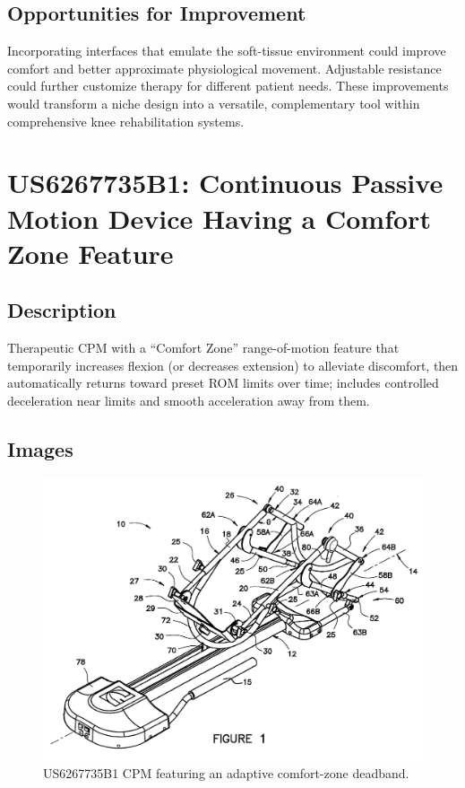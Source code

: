 \documentclass[11pt]{article}
\begin{document}
\subsection{Opportunities for Improvement}
Incorporating interfaces that emulate the soft-tissue environment could improve comfort and better approximate physiological movement. Adjustable resistance could further customize therapy for different patient needs. These improvements would transform a niche design into a versatile, complementary tool within comprehensive knee rehabilitation systems.

\section{US6267735B1: Continuous Passive Motion Device Having a Comfort Zone Feature}
\subsection{Description}
Therapeutic CPM with a ``Comfort Zone'' range-of-motion feature that temporarily increases flexion (or decreases extension) to alleviate discomfort, then automatically returns toward preset ROM limits over time; includes controlled deceleration near limits and smooth acceleration away from them.
\subsection{Images}
\begin{figure}[H]
  \centering
  \includegraphics[width=0.54\linewidth]{US6267735B1_1.png}
  \caption{US6267735B1 CPM featuring an adaptive comfort-zone deadband.}
  \label{fig:US6267735B1}
\end{figure}
\end{document}
